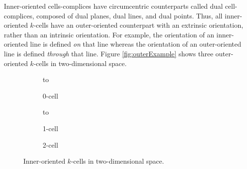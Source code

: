 Inner-oriented cells-complices have circumcentric counterparts called dual cell-complices, composed of dual planes, dual lines, and dual points. Thus, all inner-oriented $k$-cells have an outer-oriented counterpart with an extrinsic orientation, rather than an intrinsic orientation. For example, the orientation of an inner-oriented line is defined \emph{on} that line whereas the orientation of an outer-oriented line is defined \emph{through} that line. Figure \ref{fig:outerExample} shows three outer-oriented $k$-cells in two-dimensional space.
\begin{figure}[ht]
    \newsavebox\boxInner
    \centering
    \begin{subfigure}[c]{0.3\textwidth}
        \centering
        \vbox to \ht{}
        \caption{0-cell}
        \label{fig:inner0Cell}
    \end{subfigure}
    \begin{subfigure}[c]{0.3\textwidth}
        \centering
        \vbox to \ht{}
        \caption{1-cell}
        \label{fig:inner1Cell}
    \end{subfigure}
    \begin{subfigure}[c]{0.3\textwidth}
        \centering
        \centering
        \usebox{\boxInner}
        \caption{2-cell}
        \label{fig:inner2Cell}
    \end{subfigure}
    \caption{Inner-oriented $k$-cells in two-dimensional space.}
    \label{fig:innerExample}
\end{figure}
